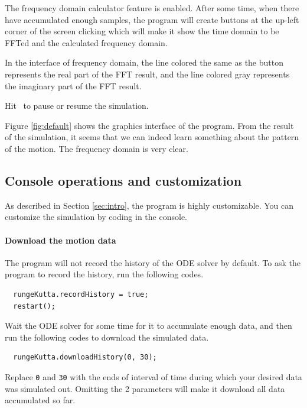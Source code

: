 \documentclass[12pt]{article}
\begin{document}
The frequency domain calculator feature is enabled.
After some time, when there have accumulated enough samples,
the program will create buttons at the up-left corner of the screen
clicking which will make it show the time domain to be FFTed
and the calculated frequency domain.

In the interface of frequency domain,
the line colored the same as the button represents the real part of the FFT result,
and the line colored gray represents the imaginary part of the FFT result.

Hit \LKeySpace ~to pause or resume the simulation.

Figure \ref{fig:default} shows the graphics interface of the program.
From the result of the simulation,
it seems that we can indeed learn something about the pattern of the motion.
The frequency domain is very clear.

\subsection{Console operations and customization}
\label{sec:customization}

As described in Section \ref{sec:intro}, the program is highly customizable.
You can customize the simulation by coding in the console\footnotemark.


\paragraph{Download the motion data}

The program will not record the history of the ODE solver by default.
To ask the program to record the history, run the following codes.

\begin{verbatim}
  rungeKutta.recordHistory = true;
  restart();
\end{verbatim}

Wait the ODE solver for some time for it to accumulate enough data,
and then run the following codes to download the simulated data.

\begin{verbatim}
  rungeKutta.downloadHistory(0, 30);
\end{verbatim}

Replace \verb!0! and \verb!30! with the ends of interval of time
during which your desired data was simulated out.
Omitting the 2 parameters will make it download all data accumulated so far.
\end{document}
